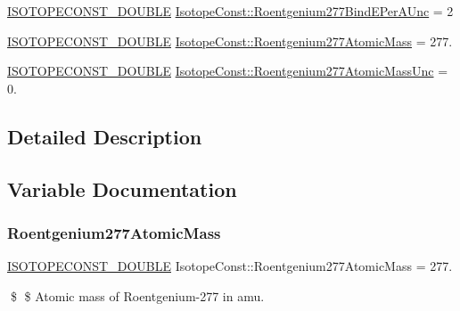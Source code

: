 \begin{DoxyCompactItemize}
\item 
\mbox{\hyperlink{group___isotope_const-_macros_ga8f45a7272ce02c0b4c65c44636ed719a}{I\+S\+O\+T\+O\+P\+E\+C\+O\+N\+S\+T\+\_\+\+D\+O\+U\+B\+LE}} \mbox{\hyperlink{group___isotope_const-_roentgenium-_rg277_ga4f8ec6851080041ef2ff75e4d7634146}{Isotope\+Const\+::\+Roentgenium277\+Bind\+E\+Per\+A\+Unc}} = 2
\item 
\mbox{\hyperlink{group___isotope_const-_macros_ga8f45a7272ce02c0b4c65c44636ed719a}{I\+S\+O\+T\+O\+P\+E\+C\+O\+N\+S\+T\+\_\+\+D\+O\+U\+B\+LE}} \mbox{\hyperlink{group___isotope_const-_roentgenium-_rg277_ga5ef2433923a80035210bdd0e31199730}{Isotope\+Const\+::\+Roentgenium277\+Atomic\+Mass}} = 277.
\item 
\mbox{\hyperlink{group___isotope_const-_macros_ga8f45a7272ce02c0b4c65c44636ed719a}{I\+S\+O\+T\+O\+P\+E\+C\+O\+N\+S\+T\+\_\+\+D\+O\+U\+B\+LE}} \mbox{\hyperlink{group___isotope_const-_roentgenium-_rg277_gab3f378140283e8e92ef78a3ebad4471d}{Isotope\+Const\+::\+Roentgenium277\+Atomic\+Mass\+Unc}} = 0.
\end{DoxyCompactItemize}


\subsection{Detailed Description}


\subsection{Variable Documentation}
\mbox{\label{group___isotope_const-_roentgenium-_rg277_ga5ef2433923a80035210bdd0e31199730}} 
\subsubsection{\texorpdfstring{Roentgenium277\+Atomic\+Mass}{Roentgenium277AtomicMass}}
{\footnotesize\ttfamily \mbox{\hyperlink{group___isotope_const-_macros_ga8f45a7272ce02c0b4c65c44636ed719a}{I\+S\+O\+T\+O\+P\+E\+C\+O\+N\+S\+T\+\_\+\+D\+O\+U\+B\+LE}} Isotope\+Const\+::\+Roentgenium277\+Atomic\+Mass = 277.}

\$ \$ Atomic mass of Roentgenium-\/277 in amu. \mbox{\label{group___isotope_const-_roentgenium-_rg277_gab3f378140283e8e92ef78a3ebad4471d}} 
